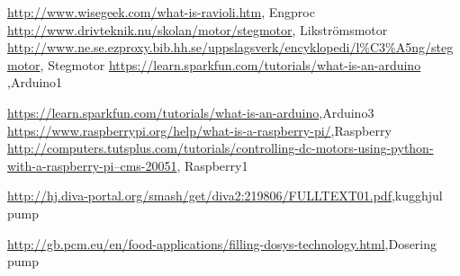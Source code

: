 \documentclass[11pt,a4paper,oneside]{book}
\begin{document}
\backmatter
 
\begin{thebibliography}{1}
\href{http://www.wisegeek.com/what-is-ravioli.htm}{http://www.wisegeek.com/what-is-ravioli.htm}, Engproc
\href{http://www.drivteknik.nu/skolan/motor/stegmotor}{http://www.drivteknik.nu/skolan/motor/stegmotor}, Likströmsmotor
\href{http://www.ne.se.ezproxy.bib.hh.se/uppslagsverk/encyklopedi/l\%C3\%A5ng/stegmotor}{http://www.ne.se.ezproxy.bib.hh.se/uppslagsverk/encyklopedi/l\%C3\%A5ng/stegmotor}, Stegmotor
\href{https://learn.sparkfun.com/tutorials/what-is-an-arduino}{https://learn.sparkfun.com/tutorials/what-is-an-arduino },Arduino1

\href{https://learn.sparkfun.com/tutorials/what-is-an-arduino}{https://learn.sparkfun.com/tutorials/what-is-an-arduino},Arduino3
\href{https://www.raspberrypi.org/help/what-is-a-raspberry-pi/}{https://www.raspberrypi.org/help/what-is-a-raspberry-pi/},Raspberry
\href{http://computers.tutsplus.com/tutorials/controlling-dc-motors-using-python-with-a-raspberry-pi--cms-20051}{http://computers.tutsplus.com/tutorials/controlling-dc-motors-using-python-with-a-raspberry-pi--cms-20051}, Raspberry1

\href{http://hj.diva-portal.org/smash/get/diva2:219806/FULLTEXT01.pdf}{http://hj.diva-portal.org/smash/get/diva2:219806/FULLTEXT01.pdf},kugghjul pump

\href{http://gb.pcm.eu/en/food-applications/filling-dosys-technology.html}{http://gb.pcm.eu/en/food-applications/filling-dosys-technology.html},Dosering pump

\end{thebibliography}
\end{document}
